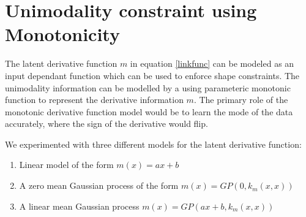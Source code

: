 \section{Unimodality constraint using Monotonicity}
The latent derivative function $m$ in equation \ref{linkfunc} can be modeled as an input dependant function which can be used to enforce shape constraints. The unimodality information can be modelled by a using parameteric monotonic function to represent the derivative information $m$. The primary role of the monotonic derivative function model would be to learn the mode of the data accurately, where the sign of the derivative would flip. 

We experimented with three different models for the latent derivative function:
\begin{enumerate}
	\item Linear model of the form $m(x)=ax+b$
	\item A zero mean Gaussian process of the form $m(x)=GP(0,k_m(x,x))$
	\item A linear mean Gaussian process $m(x)=GP(ax+b,k_m(x,x))$ 
\end{enumerate}








